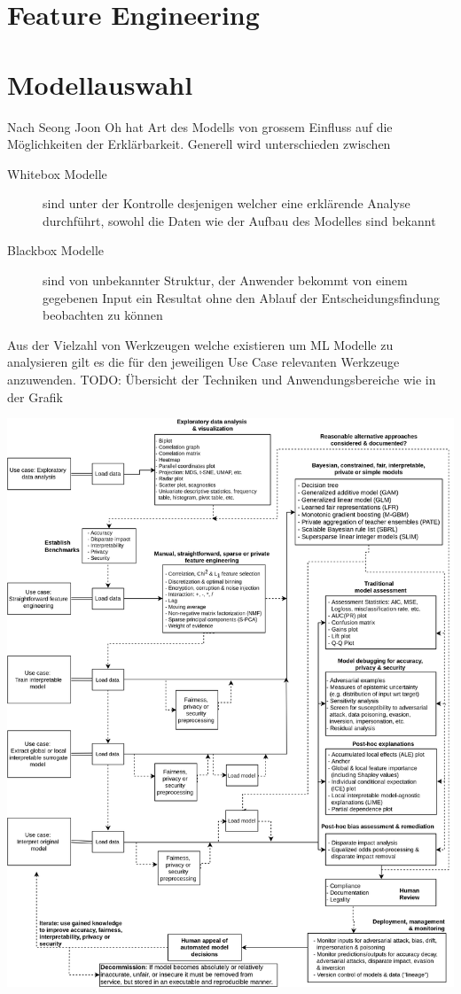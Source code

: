 \documentclass[
  12pt, %
  a4paper, %
  oneside, %
  openany, 
  numbers=noenddot, %
  BCOR=5mm, %
  parskip=half*, %
  thesis, %
]{bfhbook}
\begin{document}
\section{Feature Engineering}

\section{Modellauswahl}
Nach Seong Joon Oh \parencite{Oh2019} hat Art des Modells von grossem Einfluss auf die Möglichkeiten der Erklärbarkeit. Generell wird unterschieden zwischen
\begin{description}
\item[Whitebox Modelle] sind unter der Kontrolle desjenigen welcher eine erklärende Analyse durchführt, sowohl die Daten wie der Aufbau des Modelles sind bekannt
\item[Blackbox Modelle] sind von unbekannter Struktur, der Anwender bekommt von einem gegebenen Input ein Resultat ohne den Ablauf der Entscheidungsfindung beobachten zu können
\end{description}

Aus der Vielzahl von Werkzeugen welche existieren um \acrfull{ML} Modelle zu analysieren gilt es die für den jeweiligen Use Case relevanten Werkzeuge anzuwenden.
TODO: Übersicht der Techniken und Anwendungsbereiche wie in der Grafik

\includegraphics[width=\textwidth]{Bilder/blueprint.png}
\end{document}
